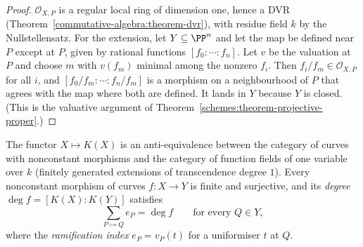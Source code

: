 \begin{proof}
$\mathcal{O}_{X,P}$ is a regular local ring of dimension one, hence a DVR (Theorem~\ref{commutative-algebra:theorem-dvr}), with residue field $k$ by the Nullstellensatz. For
the extension, let $Y \subseteq \PP^n$ and let the map be defined near $P$ except at $P$, given by rational functions $[f_0 : \cdots : f_n]$. Let $v$ be the valuation at $P$
and choose $m$ with $v(f_m)$ minimal among the nonzero $f_i$. Then $f_i/f_m \in \mathcal{O}_{X,P}$ for all $i$, and $[f_0/f_m : \cdots : f_n/f_m]$ is a morphism on a neighbourhood of
$P$ that agrees with the map where both are defined. It lands in $Y$ because $Y$ is closed. (This is the valuative argument of Theorem~\ref{schemes:theorem-projective-proper}.)
\end{proof}

\begin{theorem}\label{curves:theorem-function-fields}
The functor $X \mapsto K(X)$ is an anti-equivalence between the category of curves with nonconstant morphisms and the category of function fields of one variable over
$k$ (finitely generated extensions of transcendence degree $1$). Every nonconstant morphism of curves $f \colon X \to Y$ is finite and surjective, and its \emph{degree}
$\deg f = [K(X) : K(Y)]$ satisfies
\[
\sum_{P \mapsto Q}e_P = \deg f \qquad\text{for every } Q \in Y,
\]
where the \emph{ramification index} $e_P = v_P(t)$ for a uniformiser $t$ at $Q$.
\end{theorem}

